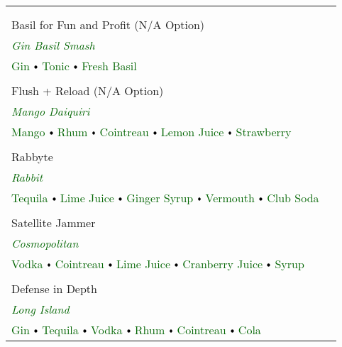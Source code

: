 \documentclass[12pt,a3paper]{article}
\makeatletter
\newcommand*\ColText[1]{\textcolor{Goldenrod3}{#1}}
\newenvironment{Group}[1]
  {\noindent\begin{tabular*}{\textwidth}{@{}p{\linewidth}@{\extracolsep{\fill}}c@{}}
    {\fontsize{24}{29}\selectfont\ColText{#1}}\\[1.0em]}
  {\end{tabular*}}
\newcommand{\cocktail}[4]{%
  \centering%
  \textcolor{darkgoldenrod}{\bfseries\Huge #1\\[.8em] #3}\\[2em]%
  \textcolor{darkgreen}{\huge \em #2}\\[2em]%
  \textcolor{darkgreen}{\LARGE #4}\\[3em]%
}
\newcommand\sbullet[1][.5]{\mathbin{\vcenter{\hbox{\scalebox{#1}{$\bullet$}}}}}
\newcommand{\mybullet}{$\sbullet[.75]$\xspace}
\newcommand{\mysep}{\vspace{1em}}
\makeatother
\begin{document}
\begin{Group}{}

\vspace{2.0em}
\cocktail{\faMortarPestle{}}{Gin Basil Smash}{Basil for Fun and Profit {\LARGE (N/A Option)}}{Gin \mybullet Tonic \mybullet Fresh Basil}

\mysep

\cocktail{\faBlender{}}{Mango Daiquiri}{Flush + Reload {\LARGE (N/A Option)}}{Mango \mybullet Rhum \mybullet Cointreau \mybullet Lemon Juice \mybullet Strawberry}

\mysep

\cocktail{\texttt{[image: Coreboot\_full.pdf]}}{Rabbit}{Rabbyte}{Tequila \mybullet Lime Juice \mybullet Ginger Syrup \mybullet Vermouth \mybullet Club Soda}

\mysep

\cocktail{\faSatellite{}}{Cosmopolitan}{Satellite Jammer}{Vodka \mybullet Cointreau \mybullet Lime Juice \mybullet Cranberry Juice \mybullet Syrup}

\mysep

\cocktail{\faShieldVirus{}}{Long Island}{Defense in Depth}{Gin \mybullet Tequila \mybullet Vodka \mybullet Rhum \mybullet Cointreau \mybullet Cola}

\end{Group}

\vfill
\end{document}
